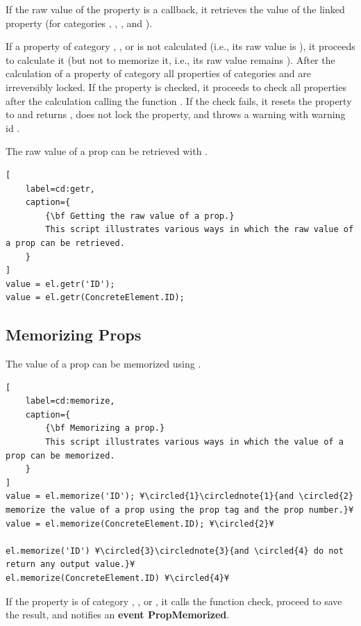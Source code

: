 \documentclass{tufte-handout}
\begin{document}
If the raw value of the property is a callback, it retrieves the value of the linked property (for categories , , , and ).
 
If a property of category , , or  is not calculated (i.e., its raw value is ), it proceeds to calculate it (but not to memorize it, i.e., its raw value remains ). After the calculation of a property of category  all properties of categories  and  are irreversibly locked.
If the property is checked, it proceeds to check all properties after the calculation calling the function . If the check fails, it resets the property to  and returns , does not lock the property, and throws a warning with warning id .

The raw value of a prop can be retrieved with .

\begin{lstlisting}[
	label=cd:getr,
	caption={
		{\bf Getting the raw value of a prop.}
		This script illustrates various ways in which the raw value of a prop can be retrieved.
	}
]
value = el.getr('ID');
value = el.getr(ConcreteElement.ID);
\end{lstlisting}

\subsection{Memorizing Props}  

The value of a prop can be memorized using .

\begin{lstlisting}[
	label=cd:memorize,
	caption={
		{\bf Memorizing a prop.}
		This script illustrates various ways in which the value of a prop can be memorized.
	}
]
value = el.memorize('ID'); ¥\circled{1}\circlednote{1}{and \circled{2} memorize the value of a prop using the prop tag and the prop number.}¥
value = el.memorize(ConcreteElement.ID); ¥\circled{2}¥

el.memorize('ID') ¥\circled{3}\circlednote{3}{and \circled{4} do not return any output value.}¥
el.memorize(ConcreteElement.ID) ¥\circled{4}¥
\end{lstlisting}

If the property is of category , , or , it calls the function check, proceed to save the result, and notifies an {\bf event PropMemorized}.
\end{document}
